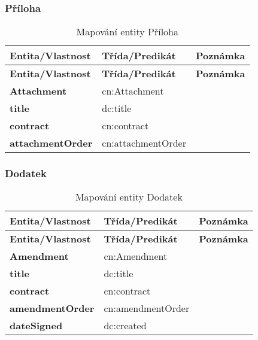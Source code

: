 \subsubsection*{Příloha}

\begin{center}
\begin{longtable}{lp{30mm}p{65mm}}
\label{grid_mlmmh} \\
\multicolumn{1}{l}{\textbf{Entita/Vlastnost}} & 
\multicolumn{1}{l}{\textbf{Třída/Predikát}} & 
\multicolumn{1}{l}{\textbf{Poznámka}} \\ \hline 
\endfirsthead
\multicolumn{1}{l}{\textbf{Entita/Vlastnost}} & 
\multicolumn{1}{l}{\textbf{Třída/Predikát}} & 
\multicolumn{1}{l}{\textbf{Poznámka}} \\ \hline 
\hline
\endhead
\endfoot
\caption{Mapování entity Příloha}
\endlastfoot
\textbf{Attachment} & cn:Attachment & \\
\textbf{title} & dc:title \\
\textbf{contract} & cn:contract \\
\textbf{attachmentOrder} & cn:attachmentOrder \\
\end{longtable}
\end{center}

\newpage

\subsubsection*{Dodatek}

\begin{center}
\begin{longtable}{lp{30mm}p{65mm}}
\label{grid_mlmmh} \\
\multicolumn{1}{l}{\textbf{Entita/Vlastnost}} & 
\multicolumn{1}{l}{\textbf{Třída/Predikát}} & 
\multicolumn{1}{l}{\textbf{Poznámka}} \\ \hline 
\endfirsthead
\multicolumn{1}{l}{\textbf{Entita/Vlastnost}} & 
\multicolumn{1}{l}{\textbf{Třída/Predikát}} & 
\multicolumn{1}{l}{\textbf{Poznámka}} \\ \hline 
\hline
\endhead
\endfoot
\caption{Mapování entity Dodatek}
\endlastfoot
\textbf{Amendment} & cn:Amendment & \\
\textbf{title} & dc:title \\
\textbf{contract} & cn:contract \\
\textbf{amendmentOrder} & cn:amendmentOrder \\
\textbf{dateSigned} & dc:created \\
\end{longtable}
\end{center}

